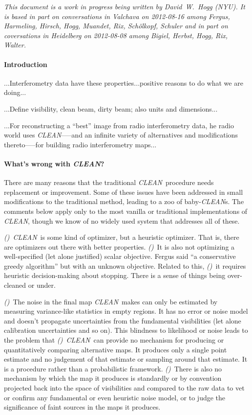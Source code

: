 \documentclass[12pt]{article}
\newcounter{hogg}
\newcommand{\hoggitem}{\textsl{(\thehogg)}\stepcounter{hogg}}
\newcommand{\project}[1]{\textsl{#1}}
\newcommand{\CLEAN}{\project{CLEAN}}
\begin{document}
\textsl{This document is a work in progress being written by
  David~W.~Hogg (NYU).  It is based in part on conversations in
  Valchava on 2012-08-16 among Fergus, Harmeling, Hirsch, Hogg,
  Muandet, Rix, Sch\"olkopf, Schuler and in part on coversations in
  Heidelberg on 2012-08-08 among Bigiel, Herbst, Hogg, Rix, Walter.}

\paragraph{Introduction}

...Interferometry data have these properties...positive reasons to do
what we are doing...

...Define visibility, clean beam, dirty beam; also units and
dimensions...

...For reconstructing a ``best'' image from radio interferometry data,
he radio world uses \CLEAN--—and an infinite variety of alternatives
and modifications thereto—--for building radio interferometry maps...

\paragraph{What's wrong with \CLEAN?}

There are many reasons that the traditional \CLEAN\ procedure needs
replacement or improvement.  Some of these issues have been addressed
in small modifications to the traditional method, leading to a zoo of
baby-\CLEAN s.  The comments below apply only to the most vanilla or
traditional implementations of \CLEAN, though we know of no widely
used system that addresses all of these.

\hoggitem~\CLEAN\ is some kind of optimizer, but a heuristic
optimizer.  That is, there are optimizers out there with better
properties.  \hoggitem~It is also not optimizing a well-specified (let
alone justified) scalar objective.  Fergus said ``a conservative
greedy algorithm'' but with an unknown objective.  Related to this,
\hoggitem~it requires heuristic decision-making about stopping.  There
is a sense of things being over-cleaned or under.

\hoggitem~The noise in the final map \CLEAN\ makes can only be
estimated by measuring variance-like statistics in empty regions.  It
has no error or noise model and doesn't propagate uncertainties from
the fundamental visibilities (let alone calibration uncertainties and
so on).  This blindness to likelihood or noise leads to the problem
that \hoggitem~\CLEAN\ can provide no mechanism for producing or
quantitatively comparing alternative maps.  It produces only a single
point estimate and no judgement of that estimate or sampling around
that estimate.  It is a procedure rather than a probabilistic
framework.  \hoggitem~There is also no mechanism by which the map it
produces is standardly or by convention projected back into the space
of visibilities and compared to the raw data to vet or confirm any
fundamental or even heuristic noise model, or to judge the
significance of faint sources in the maps it produces.
\end{document}

